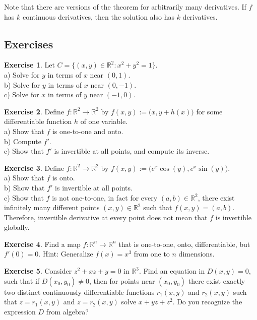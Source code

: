 \documentclass[12pt]{book}
\newcommand{\R}{{\mathbb{R}}}
\theoremstyle{plain}
\theoremstyle{remark}
\theoremstyle{definition}
\theoremstyle{exercise}
\newtheorem{exercise}{Exercise}[section]
\theoremstyle{example}
\begin{document}
Note that there are versions of the theorem for arbitrarily many derivatives.
If $f$ has $k$ continuous derivatives, then the solution also has $k$
derivatives.


\subsection{Exercises}

\begin{exercise}
Let $C = \{ (x,y) \in \R^2 : x^2+y^2 = 1 \}$. \\
a) Solve for $y$ in terms of $x$ near $(0,1)$.\\
b) Solve for $y$ in terms of $x$ near $(0,-1)$.\\
c) Solve for $x$ in terms of $y$ near $(-1,0)$.
\end{exercise}

\begin{exercise}
Define $f \colon \R^2 \to \R^2$ by $f(x,y) :=
\bigl(x,y+h(x)\bigr)$ for some differentiable function $h$ of one
variable.\\
a) Show that $f$ is one-to-one and onto.\\
b) Compute $f'$.\\
c) Show that $f'$ is invertible at all points, and compute
its inverse.
\end{exercise}

\begin{exercise}
Define $f \colon \R^2 \to \R^2$ by $f(x,y) :=
\bigl(e^x\cos(y),e^x\sin(y)\bigr)$.\\
a) Show that $f$ is onto.\\
b) Show that $f'$ is invertible at all points.\\
c) Show that $f$ is not one-to-one, in fact for every $(a,b) \in \R^2$,
there exist infinitely many different points $(x,y) \in \R^2$ such that 
$f(x,y) = (a,b)$.\\
Therefore, invertible derivative at every point does not mean that
$f$ is invertible globally.
\end{exercise}

\begin{exercise}
Find a map $f \colon \R^n \to \R^n$ that is one-to-one, onto,
differentiable, but $f'(0) = 0$.  Hint: Generalize $f(x) = x^3$ from one
to $n$ dimensions.
\end{exercise}

\begin{exercise}
Consider $z^2 + xz + y =0$ in $\R^3$.  Find an equation in $D(x,y)=0$, such that
if $D(x_0,y_0) \not= 0$, then for points near $(x_0,y_0)$ there exist
exactly two distinct continuously differentiable functions $r_1(x,y)$
and $r_2(x,y)$ such that $z=r_1(x,y)$ and $z=r_2(x,y)$ solve
$x+yz+z^2$.  Do you recognize the expression $D$ from algebra?
\end{exercise}
\end{document}
